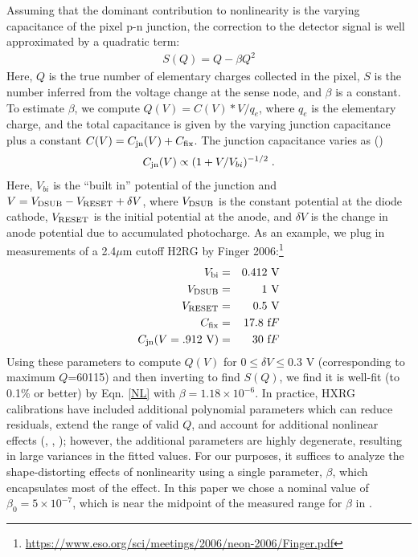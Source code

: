 \documentclass[11pt,preprint,flushrt]{aastex}
\begin{document}
Assuming that the dominant contribution to nonlinearity is the varying capacitance of the pixel p-n junction, the correction to the detector signal is well approximated by a quadratic term:
\begin{align}
S(Q)= Q - \beta Q ^2
\label{NL}
\end{align}
Here, $Q$ is the true number of elementary charges collected in the pixel, $S$ is the number inferred from the voltage change at the sense node, and $\beta$ is a constant.  To estimate $\beta$, we compute $Q(V)=C(V)*V/q_e$, where $q_e$ is the elementary charge, and the total capacitance is given by the varying junction capacitance plus a constant $C(V) = C_{\rm jn}(V) + C_{\rm fix}$. The junction capacitance varies as (\citealt{mccaughrean87})
\begin{equation}
C_{\rm jn}(V) \propto (1+V/V_{bi})^{-1/2} \;.
\end{equation}
Here, $V_{bi}$ is the ``built in'' potential of the junction and $V=V_{\rm DSUB}-V_{\rm RESET}+\delta V$, where $V_{\rm DSUB}$ is the constant potential at the diode cathode, $V_{\rm RESET}$ is the initial potential at the anode, and $\delta V$ is the change in anode potential due to accumulated photocharge.  As an example, we plug in measurements of a 2.4$\mu$m cutoff H2RG by Finger 2006:\footnote{\url{https://www.eso.org/sci/meetings/2006/neon-2006/Finger.pdf}}
\begin{eqnarray*}
V_{\rm bi} &=& 0.412\ {\mbox V} \\
V_{\rm DSUB} &=& 1\ {\mbox V} \\
V_{\rm RESET} &=& 0.5\ {\mbox V} \\
C_{\rm fix} &=& 17.8\ {\mbox fF} \\
C_{\rm jn}(V=.912\ {\mbox V}) &=& 30\ {\mbox fF}
\end{eqnarray*}
Using these parameters to compute $Q(V)$ for $ 0\le \delta V \le 0.3$ V (corresponding to maximum $Q$=60115) and then inverting to find $S(Q)$, we find it is well-fit (to 0.1\% or better) by Eqn. \ref{NL} with $\beta=1.18 \times 10^{-6}$. In practice, HXRG calibrations have included additional polynomial parameters which can reduce residuals, extend the range of valid $Q$, and account for additional nonlinear effects (\citealt{hilbert04}, \citealt{hilbert08}, \citealt{hilbert14}); however, the additional parameters are highly degenerate, resulting in large variances in the fitted values.  For our purposes, it suffices to analyze the shape-distorting effects of nonlinearity using a single parameter, $\beta$, which encapsulates most of the effect. In this paper we chose a nominal value of $\beta_0=5\times 10^{-7}$, which is near the midpoint of the measured range for $\beta$ in \citealt{hilbert14}. 
\end{document}
